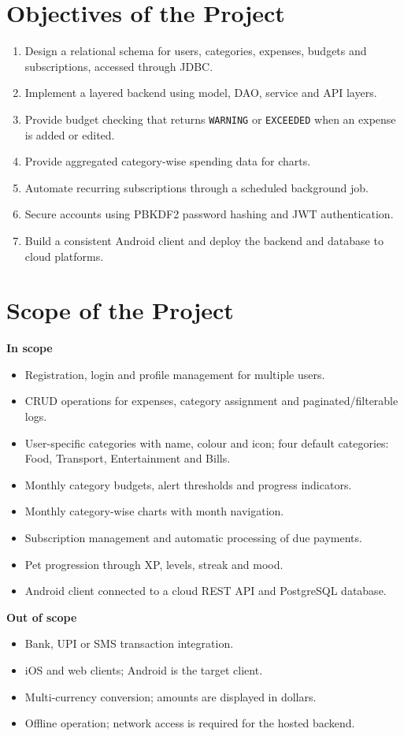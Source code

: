 \documentclass[12pt,a4paper]{report}
\begin{document}
\section{Objectives of the Project}
\begin{enumerate}
\item Design a relational schema for users, categories, expenses, budgets and subscriptions, accessed through JDBC.
\item Implement a layered backend using model, DAO, service and API layers.
\item Provide budget checking that returns \texttt{WARNING} or \texttt{EXCEEDED} when an expense is added or edited.
\item Provide aggregated category-wise spending data for charts.
\item Automate recurring subscriptions through a scheduled background job.
\item Secure accounts using PBKDF2 password hashing and JWT authentication.
\item Build a consistent Android client and deploy the backend and database to cloud platforms.
\end{enumerate}

\section{Scope of the Project}
\textbf{In scope}
\begin{itemize}
\item Registration, login and profile management for multiple users.
\item CRUD operations for expenses, category assignment and paginated/filterable logs.
\item User-specific categories with name, colour and icon; four default categories: Food, Transport, Entertainment and Bills.
\item Monthly category budgets, alert thresholds and progress indicators.
\item Monthly category-wise charts with month navigation.
\item Subscription management and automatic processing of due payments.
\item Pet progression through XP, levels, streak and mood.
\item Android client connected to a cloud REST API and PostgreSQL database.
\end{itemize}
\textbf{Out of scope}
\begin{itemize}
\item Bank, UPI or SMS transaction integration.
\item iOS and web clients; Android is the target client.
\item Multi-currency conversion; amounts are displayed in dollars.
\item Offline operation; network access is required for the hosted backend.
\end{itemize}
\end{document}

